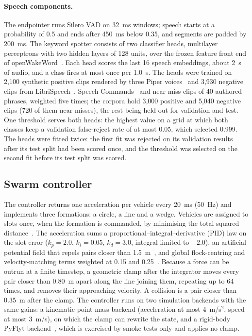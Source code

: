 \documentclass[a4paper,fleqn]{cas-dc}
\begin{document}
\paragraph{Speech components.} The endpointer runs Silero VAD on 32~ms windows; speech starts at a
probability of 0.5 and ends after 450~ms below 0.35, and segments are padded by 200~ms. The keyword
spotter consists of two classifier heads, multilayer perceptrons with two hidden layers of 128 units,
over the frozen feature front end of openWakeWord~\citep{oww}. Each head scores the last 16 speech
embeddings, about 2~s of audio, and a class fires at most once per 1.0~s. The heads were trained on
2,100 synthetic positive clips rendered by three Piper voices~\citep{piper} and 3,930 negative clips
from LibriSpeech~\citep{librispeech}, Speech Commands~\citep{speechcmd} and near-miss clips of
40 authored phrases, weighted five times; the corpora hold 3,000 positive and 5,040 negative clips
(720 of them near misses), the rest being held out for validation and test. One threshold serves
both heads: the highest value on a grid at which both classes keep a validation false-reject rate of
at most 0.05, which selected 0.999. The heads were fitted twice: the first fit was rejected on its
validation results after its test split had been scored once, and the threshold was selected on the
second fit before its test split was scored.

\subsection{Swarm controller}
\label{sec:controller}

The controller returns one acceleration per vehicle every 20~ms (50~Hz) and implements three
formations: a circle, a line and a wedge. Vehicles are assigned to slots once, when the formation is
commanded, by minimising the total squared distance~\citep{turpin2014}. The acceleration sums a
proportional--integral--derivative (PID) law on the slot error ($k_p = 2.0$, $k_i = 0.05$, $k_d = 3.0$, integral limited to $\pm 2.0$), an
artificial potential field that repels pairs closer than 1.5~m~\citep{khatib1986}, and global
flock-centring and velocity-matching terms weighted at 0.15 and 0.25~\citep{reynolds1987}. Because a
force can be outrun at a finite timestep, a geometric clamp after the integrator moves every pair
closer than 0.80~m apart along the line joining them, repeating up to 64 times, and removes their
approaching velocity. A collision is a pair closer than 0.35~m after the clamp. The controller runs
on two simulation backends with the same gains: a kinematic point-mass backend (acceleration at most
4~m/s$^2$, speed at most 3~m/s), on which the clamp can rewrite the state, and a rigid-body PyFlyt
backend~\citep{pyflyt}, which is exercised by smoke tests only and applies no clamp.
\end{document}
